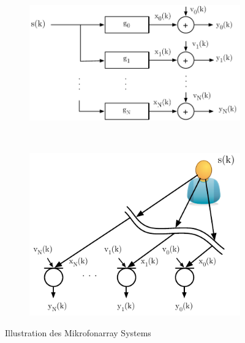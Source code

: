 \begin{figure}
        \centering
        \begin{subfigure}[b]{0.48\textwidth}
                \centering
                \includegraphics[width=\textwidth]{images/02_Konzeptionierung/IllustrationMikrofonarraySystem_a}
                \caption{}
                \label{fig:IllustrationMikrofonarraySystems_a}
        \end{subfigure}
        ~ %
        \begin{subfigure}[b]{0.48\textwidth}
                \centering
                \includegraphics[width=\textwidth]{images/02_Konzeptionierung/IllustrationMikrofonarraySystem_b}
                \caption{}
                \label{fig:IllustrationMikrofonarraySystems_b}
        \end{subfigure}
        \caption{Illustration des Mikrofonarray Systems}
\end{figure}


